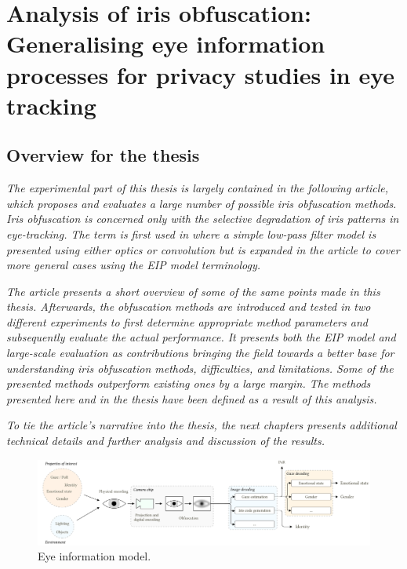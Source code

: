 \chapter{Analysis of iris obfuscation: Generalising eye information processes for privacy studies in eye tracking}

\section*{Overview for the thesis}

\emph{
The experimental part of this thesis is largely contained in the following article, which proposes and evaluates a large number of possible iris obfuscation methods. Iris obfuscation is concerned only with the selective degradation of iris patterns in eye-tracking. The term is first used in \cite{BRENDAN_BLUR} where a simple low-pass filter model is presented using either optics or convolution but is expanded in the article to cover more general cases using the EIP model terminology. }

\emph{The article presents a short overview of some of the same points made in this thesis. Afterwards, the obfuscation methods are introduced and tested in two different experiments to first determine appropriate method parameters and subsequently evaluate the actual performance. It presents both the EIP model and large-scale evaluation as contributions bringing the field towards a better base for understanding iris obfuscation methods, difficulties, and limitations. Some of the presented methods outperform existing ones by a large margin. The methods presented here and in the thesis have been defined as a result of this analysis.}

\emph{To tie the article's narrative into the thesis, the next chapters presents additional technical details and further analysis and discussion of the results.}


\begin{figure}[b]
    \centering
    \includegraphics[width=1\textwidth]{figures/Model.pdf}
    \caption{Eye information model.}
    \label{fig:overview}
\end{figure}








% 


